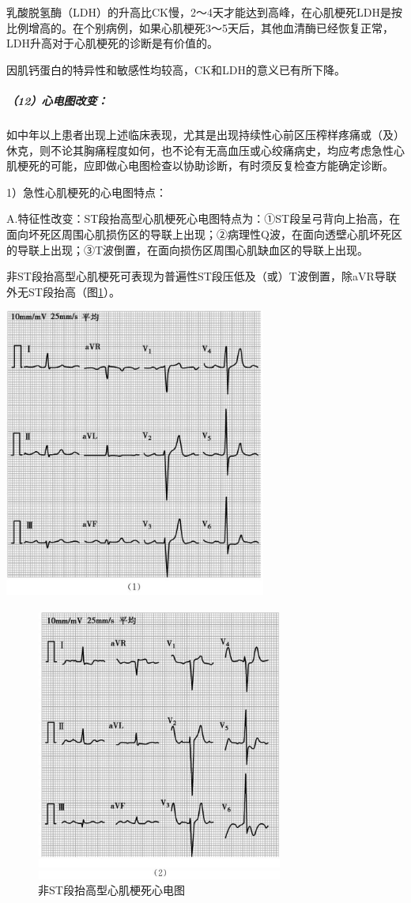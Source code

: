 乳酸脱氢酶（LDH）的升高比CK慢，2～4天才能达到高峰，在心肌梗死LDH是按比例增高的。在个别病例，如果心肌梗死3～5天后，其他血清酶已经恢复正常，LDH升高对于心肌梗死的诊断是有价值的。

因肌钙蛋白的特异性和敏感性均较高，CK和LDH的意义已有所下降。

\subparagraph{（12）心电图改变：}

如中年以上患者出现上述临床表现，尤其是出现持续性心前区压榨样疼痛或（及）休克，则不论其胸痛程度如何，也不论有无高血压或心绞痛病史，均应考虑急性心肌梗死的可能，应即做心电图检查以协助诊断，有时须反复检查方能确定诊断。

1）急性心肌梗死的心电图特点：

A.特征性改变：ST段抬高型心肌梗死心电图特点为：①ST段呈弓背向上抬高，在面向坏死区周围心肌损伤区的导联上出现；②病理性Q波，在面向透壁心肌坏死区的导联上出现；③T波倒置，在面向损伤区周围心肌缺血区的导联上出现。

非ST段抬高型心肌梗死可表现为普遍性ST段压低及（或）T波倒置，除aVR导联外无ST段抬高（图\ref{fig10-1}）。

\includegraphics[width=3.38542in,height=3.75in]{./images/Image00070.jpg}

\begin{figure}[!htbp]
 \centering
 \includegraphics[width=3.19792in,height=3.55208in]{./images/Image00071.jpg}
 \captionsetup{justification=centering}
 \caption{非ST段抬高型心肌梗死心电图}
 \label{fig10-1}
  \end{figure} 

